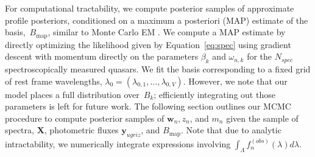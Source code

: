 \documentclass{article} %
\begin{document}
For computational tractability, we compute posterior samples of approximate profile posteriors, conditioned on a maximum a posteriori (MAP) estimate of the basis,~$B_{\text{map}}$, similar to Monte Carlo EM  \cite{wei1990monte}.  
We compute a MAP estimate by directly optimizing the likelihood given by Equation~\ref{eq:spec} using gradient descent with momentum directly on the parameters $\beta_k$ and $\omega_{n,k}$ for the $N_{spec}$ spectroscopically measured quasars.  We fit the basis corresponding to a fixed grid of rest frame wavelengths, $\lambda_0 = (\lambda_{0,1}, \dots, \lambda_{0,V})$.  
However, we note that our model places a full distribution over~$B_k$; efficiently integrating out those parameters is left for future work.
The following section outlines our MCMC procedure to compute posterior samples of $\mathbf{w}_n, z_n$, and $m_n$ given the sample of spectra, $\mathbf{X}$, photometric fluxes $\mathbf{y}_{ugriz}$, and $B_{\text{map}}$.
Note that due to analytic intractability, we numerically integrate expressions involving $\int_\Lambda f_n^{(obs)}(\lambda) d\lambda$.

\end{document}
